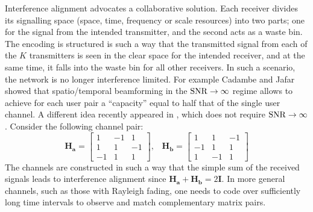 \documentclass[journal]{IEEEtran}
\begin{document}
Interference alignment advocates a collaborative solution. Each receiver
divides its signalling space (space, time, frequency or scale resources)
into two  parts; one for the signal from the intended
transmitter, and the second acts as a waste bin. The encoding is structured
is such a way that the transmitted signal from each of the $K$ transmitters
is seen in the clear space for the intended receiver, and at the same
time, it falls into the waste bin for all other receivers. In such a
scenario, the network is no longer interference limited. For
example Cadambe and Jafar \cite{cadambe}
showed that spatio/temporal beamforming
in the ${\rm{SNR}}\rightarrow\infty$ regime allows to achieve for each user
pair a {}``capacity'' equal to half that 
of the single user channel. A different
idea recently appeared in \cite{nazer},
which does not require ${\rm{SNR}}\rightarrow\infty$. Consider
the following channel pair:
%
\begin{equation}
\mathbf{H_{a}}=\left[\begin{array}{ccc}
1 & -1 & 1\\
1 & 1 & -1\\
-1 & 1 & 1\end{array}\right],\;\;\; 
\mathbf{H_{b}}=\left[\begin{array}{ccc}
1 & 1 & -1\\
-1 & 1 & 1\\
1 & -1 & 1\end{array}\right]\label{eq:martix_pair}\end{equation}
The channels are constructed in such a way that the simple sum of the
received signals leads to interference alignment since $\mathbf{H_{a}}+\mathbf{H_{b}=\mathrm{2}I}$.
In more general channels, such as those with Rayleigh fading, 
one needs to code
over sufficiently long time intervals to observe and match complementary
matrix pairs. 
%
\end{document}
